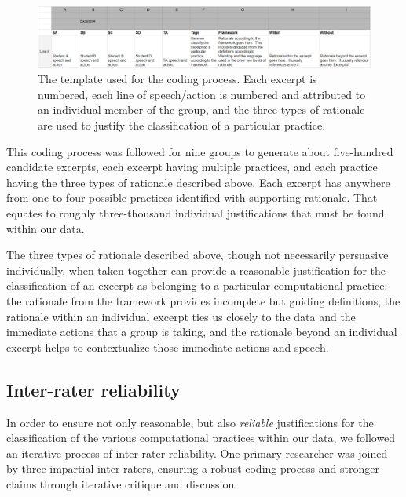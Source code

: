 \documentclass{msuphddissertation}
\begin{document}
\begin{doublespace}
\begin{figure}\centering
\includegraphics[scale=0.42]{./images/CH5Levels.pdf}
\caption{The template used for the coding process.  Each excerpt is numbered, each line of speech/action is numbered and attributed to an individual member of the group, and the three types of rationale are used to justify the classification of a particular practice.}\label{CH5:Types}
\end{figure}

This coding process was followed for nine groups to generate about five-hundred candidate excerpts, each excerpt having multiple practices, and each practice having the three types of rationale described above.  Each excerpt has anywhere from one to four possible practices identified with supporting rationale.  That equates to roughly three-thousand individual justifications that must be found within our data.

The three types of rationale described above, though not necessarily persuasive individually, when taken together can provide a reasonable justification for the classification of an excerpt as belonging to a particular computational practice: the rationale from the framework provides incomplete but guiding definitions, the rationale within an individual excerpt ties us closely to the data and the immediate actions that a group is taking, and the rationale beyond an individual excerpt helps to contextualize those immediate actions and speech.

\subsection{Inter-rater reliability}

In order to ensure not only reasonable, but also \textit{reliable} justifications for the classification of the various computational practices within our data, we followed an iterative process of inter-rater reliability.  One primary researcher was joined by three impartial inter-raters, ensuring a robust coding process and stronger claims through iterative critique and discussion.


\end{doublespace}
\end{document}
